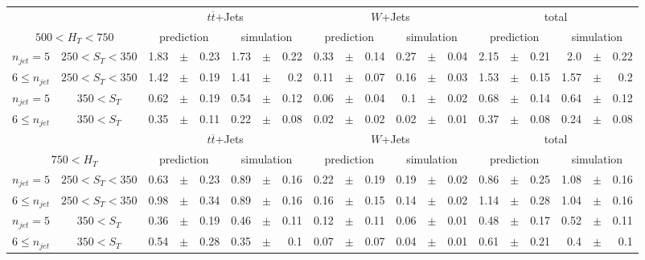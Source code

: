 \documentclass[12pt]{paper}
\begin{document}
\begin{sidewaystable}[ht]
\begin{center}
\begin{tabular}{cc|rrr|rrr|rrr|rrr|rrr|rrr}
& & \multicolumn{6}{c|}{$t\overline{t}$+Jets}&\multicolumn{6}{c|}{$W$+Jets}&\multicolumn{6}{c}{total}\\
\multicolumn{2}{c|}{$500< H_{T}< 750$} & \multicolumn{3}{c}{prediction}&\multicolumn{3}{c|}{simulation}&\multicolumn{3}{c}{prediction}&\multicolumn{3}{c|}{simulation}&\multicolumn{3}{c}{prediction}&\multicolumn{3}{c}{simulation}\\\hline
$n_{jet}=5$ & $250< S_{T}< 350$ & 1.83&$\pm$&0.23 & 1.73&$\pm$&0.22 & 0.33&$\pm$&0.14 & 0.27&$\pm$&0.04 & 2.15&$\pm$&0.21 & 2.0&$\pm$&0.22\\
$6\leq n_{jet}$ & $250< S_{T}< 350$ & 1.42&$\pm$&0.19 & 1.41&$\pm$&0.2 & 0.11&$\pm$&0.07 & 0.16&$\pm$&0.03 & 1.53&$\pm$&0.15 & 1.57&$\pm$&0.2\\
$n_{jet}=5$ & $350< S_{T}$ & 0.62&$\pm$&0.19 & 0.54&$\pm$&0.12 & 0.06&$\pm$&0.04 & 0.1&$\pm$&0.02 & 0.68&$\pm$&0.14 & 0.64&$\pm$&0.12\\
$6\leq n_{jet}$ & $350< S_{T}$ & 0.35&$\pm$&0.11 & 0.22&$\pm$&0.08 & 0.02&$\pm$&0.02 & 0.02&$\pm$&0.01 & 0.37&$\pm$&0.08 & 0.24&$\pm$&0.08\\
\hline
& & \multicolumn{6}{c|}{$t\overline{t}$+Jets}&\multicolumn{6}{c|}{$W$+Jets}&\multicolumn{6}{c}{total}\\
\multicolumn{2}{c|}{$750< H_{T}$} & \multicolumn{3}{c}{prediction}&\multicolumn{3}{c|}{simulation}&\multicolumn{3}{c}{prediction}&\multicolumn{3}{c|}{simulation}&\multicolumn{3}{c}{prediction}&\multicolumn{3}{c}{simulation}\\\hline
$n_{jet}=5$ & $250< S_{T}< 350$ & 0.63&$\pm$&0.23 & 0.89&$\pm$&0.16 & 0.22&$\pm$&0.19 & 0.19&$\pm$&0.02 & 0.86&$\pm$&0.25 & 1.08&$\pm$&0.16\\
$6\leq n_{jet}$ & $250< S_{T}< 350$ & 0.98&$\pm$&0.34 & 0.89&$\pm$&0.16 & 0.16&$\pm$&0.15 & 0.14&$\pm$&0.02 & 1.14&$\pm$&0.28 & 1.04&$\pm$&0.16\\
$n_{jet}=5$ & $350< S_{T}$ & 0.36&$\pm$&0.19 & 0.46&$\pm$&0.11 & 0.12&$\pm$&0.11 & 0.06&$\pm$&0.01 & 0.48&$\pm$&0.17 & 0.52&$\pm$&0.11\\
$6\leq n_{jet}$ & $350< S_{T}$ & 0.54&$\pm$&0.28 & 0.35&$\pm$&0.1 & 0.07&$\pm$&0.07 & 0.04&$\pm$&0.01 & 0.61&$\pm$&0.21 & 0.4&$\pm$&0.1\\
\end{tabular}
\end{center}
\end{sidewaystable}
\end{document}
